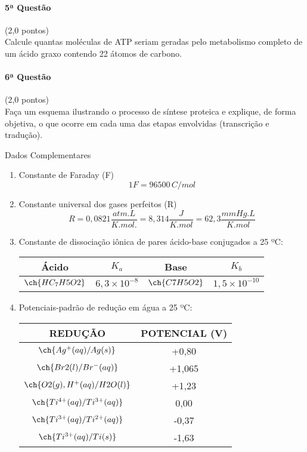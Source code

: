 \documentclass[12pt,a4paper]{article}
\begin{document}
\paragraph{5ª Questão} (2,0 pontos)\\
Calcule quantas moléculas de ATP seriam geradas pelo metabolismo completo de um ácido graxo contendo 22 átomos de carbono.

\paragraph{6ª Questão} (2,0 pontos)\\
Faça um esquema ilustrando o processo de síntese proteica e explique, de forma objetiva, o que ocorre em cada uma das etapas envolvidas (transcrição e tradução).

\hfill

Dados Complementares

\begin{enumerate}[label=\Alph*.]
\item Constante de Faraday (F)$$1F = 96500\, C/mol$$
\item Constante universal dos gases perfeitos (R) $$R = 0,0821 \frac{atm.L}{K.mol.} = 8,314 \frac{J}{K.mol} = 62,3 \frac{mmHg.L}{K.mol}$$
\item Constante de dissociação iônica de pares ácido-base conjugados a 25 ºC: 

\begin{tabular}{|c|c|c|c|}
Ácido & $K_a$ & Base & $K_b$ \\ \hline $\ch{HC_7H5O2}$ & $6,3 \times 10^{-8}$ & $\ch{C7H5O2}$ & $1,5 \times 10^{-10}$
\end{tabular}
\item Potenciais-padrão de redução em água a 25 ºC:

\begin{tabular}{||c|c||}
\hline REDUÇÃO & POTENCIAL (V) \\ \hline $\ch{Ag^+ (aq) / Ag (s)}$ & +0,80  \\ \hline $\ch{Br2 (l) / Br^- (aq)}$ & +1,065 \\ \hline $\ch{O2 (g), H^+ (aq) / H2O (l)}$ & +1,23 \\ \hline $\ch{Ti^{4+} (aq) / Ti^{3+} (aq)}$ & 0,00 \\ \hline $\ch{Ti^{3+} (aq) / Ti^{2+} (aq)}$ & -0,37 \\ \hline $\ch{Ti^{3+} (aq)/ Ti (s)}$ & -1,63 \\ \hline
\end{tabular}
\end{enumerate}
\end{document}
